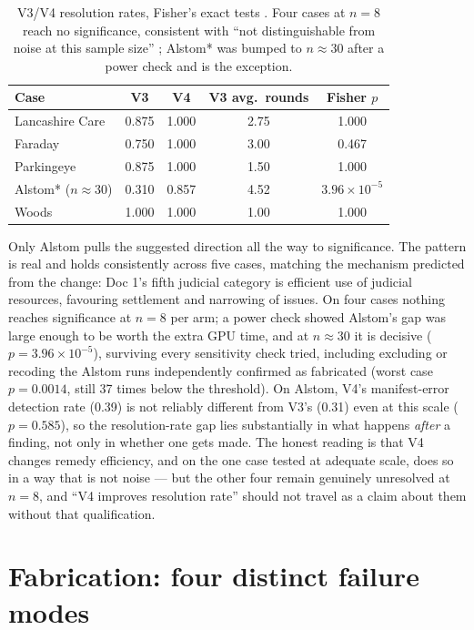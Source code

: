 \begin{table}[htbp]
\centering
\footnotesize
\caption[Ablation significance]{V3/V4 resolution rates, Fisher's exact
tests \cite{fisher1922interpretation}. Four cases at $n=8$ reach no
significance, consistent with ``not distinguishable from noise at this
sample size'' \cite{dror2018hitchhiker}; Alstom* was bumped to
$n{\approx}30$ after a power check and is the exception.}
\label{tab:ablation}
\begin{tabular}{@{}lcccc@{}}
\toprule
\textbf{Case} & \textbf{V3} & \textbf{V4} & \textbf{V3 avg.\ rounds} & \textbf{Fisher $p$} \\
\midrule
Lancashire Care & 0.875 & 1.000 & 2.75 & 1.000 \\
Faraday & 0.750 & 1.000 & 3.00 & 0.467 \\
Parkingeye & 0.875 & 1.000 & 1.50 & 1.000 \\
Alstom* ($n{\approx}30$) & 0.310 & 0.857 & 4.52 & $3.96\times10^{-5}$ \\
Woods & 1.000 & 1.000 & 1.00 & 1.000 \\
\bottomrule
\end{tabular}
\end{table}

Only Alstom pulls the suggested direction all the way to significance. The
pattern is real and holds consistently across five cases, matching the
mechanism predicted from the change: Doc 1's fifth judicial category is
efficient use of judicial resources, favouring settlement and narrowing of
issues. On four cases nothing reaches significance at $n=8$ per arm; a
power check showed Alstom's gap was large enough to be worth the extra GPU
time, and at $n{\approx}30$ it is decisive ($p=3.96\times10^{-5}$),
surviving every sensitivity check tried, including excluding or recoding
the Alstom runs independently confirmed as fabricated (worst case
$p=0.0014$, still 37 times below the threshold). On Alstom, V4's
manifest-error detection rate (0.39) is not reliably different from V3's
(0.31) even at this scale ($p=0.585$), so the resolution-rate gap lies
substantially in what happens \emph{after} a finding, not only in whether
one gets made. The honest reading is that V4 changes remedy efficiency, and
on the one case tested at adequate scale, does so in a way that is not
noise --- but the other four remain genuinely unresolved at $n=8$, and ``V4
improves resolution rate'' should not travel as a claim about them without
that qualification.

\section{Fabrication: four distinct failure modes}
\label{sec:fabrication}

